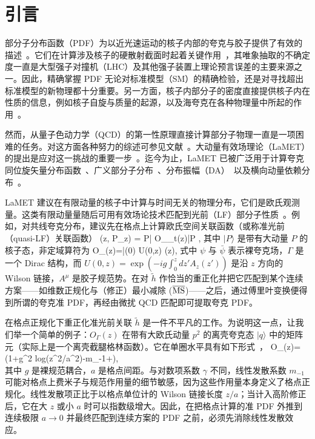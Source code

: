 \section{引言}\label{sec:intro}

部分子分布函数（PDF）为以近光速运动的核子内部的夸克与胶子提供了有效的描述~\cite{Ellis:1991qj,Thomas:2001kw}。它们在计算涉及核子的硬散射截面时起着关键作用~\cite{Gao:2017yyd}，其唯象抽取的不确定度一直是大型强子对撞机（LHC）及其他强子装置上理论预言误差的主要来源之一。因此，精确掌握 PDF 无论对标准模型（SM）的精确检验，还是对寻找超出标准模型的新物理都十分重要。另一方面，核子内部分子的密度直接提供核子内在性质的信息，例如核子自旋与质量的起源，以及海夸克在各种物理量中所起的作用~\cite{Accardi:2012qut}。

然而，从量子色动力学（QCD）的第一性原理直接计算部分子物理一直是一项困难的任务。对这方面各种努力的综述可参见文献~\cite{Cichy:2018mum}。大动量有效场理论（LaMET）的提出是应对这一挑战的重要一步~\cite{Ji:2013dva,Ji:2014hxa,Ji:2020ect}。迄今为止，LaMET 已被广泛用于计算夸克同位旋矢量分布函数~\cite{Lin:2014zya,Alexandrou:2015rja,Chen:2016utp,Alexandrou:2016jqi,Alexandrou:2018pbm,Chen:2018xof,Lin:2018pvv,Liu:2018uuj,Alexandrou:2018eet,Liu:2018hxv,Chen:2018fwa,Izubuchi:2019lyk,Shugert:2020tgq,Chai:2020nxw,Lin:2020ssv,Fan:2020nzz}、广义部分子分布~\cite{Chen:2019lcm,Alexandrou:2019dax}、分布振幅（DA）~\cite{Zhang:2017bzy,Chen:2017gck,Zhang:2020gaj}以及横向动量依赖分布~\cite{Shanahan:2019zcq,Shanahan:2020zxr,Zhang:2020dbb}。

LaMET 建议在有限动量的核子中计算与时间无关的物理分布，它们是欧氏观测量。这类有限动量量随后可用有效场论技术匹配到光前（LF）部分子性质~\cite{Ji:2020byp}。例如，对共线夸克分布，建议先在格点上计算欧氏空间关联函数（或称准光前（quasi-LF）关联函数）
\bea\label{eq:quasi}
(z, P_z) = \langle P| O_{\gamma_t}(z)|P \rangle,
\eea
其中 $|P\rangle$ 是带有大动量 $P$ 的核子态，非定域算符为
\bea\label{eq:operator}
O_{\Gamma}(z)=\bar{\psi}(0) \Gamma U(0,z) \psi (z),
\eea
式中 $\psi$ 与 $\bar{\psi}$ 表示裸夸克场，$\Gamma$ 是一个 Dirac 结构，而 $U(0, z) = \exp(-ig\int_0^{z} dz' A_z(z'))$ 是沿 $z$ 方向的 Wilson 链接，$A^\mu$ 是胶子规范势。在对 $\tilde{h}$ 作恰当的重正化并把它匹配到某个连续方案——如维数正规化与（修正）最小减除 ($\overline{\rm MS}$)——之后，通过傅里叶变换便得到所谓的夸克准 PDF，再经由微扰 QCD 匹配即可提取夸克 PDF。

在格点正规化下重正化准光前关联 $\tilde{h}$ 是一件不平凡的工作。为说明这一点，让我们举一个简单的例子：$O_\Gamma(z)$ 在带有大欧氏动量 $p^2$ 的离壳夸克态 $|q\rangle$ 中的矩阵元（实际上是一个离壳截腿格林函数）。它在单圈水平具有如下形式~\cite{Alexandrou:2017huk}，
\bea\label{eq:1-loop}
\langle O_{\Gamma}(z)\rangle =\Gamma\left(1+\gamma g^2 \textrm{log}(z^2/a^2)-m_{-1}+\cdots\cdots\right),\nonumber\\
\eea
其中 $g$ 是裸规范耦合，$a$ 是格点间距。与对数项系数 $\gamma$ 不同，线性发散系数 $m_{-1}$ 可能对格点上费米子与规范作用量的细节敏感，因为这些作用量本身定义了格点正规化。线性发散项正比于以格点单位计的 Wilson 链接长度 $z/a$；当计入高阶修正后，它在大 $z$ 或小 $a$ 时可以指数级增大。因此，在把格点计算的准 PDF 外推到连续极限 $a\rightarrow0$ 并最终匹配到连续方案的 PDF 之前，必须先消除线性发散效应。

